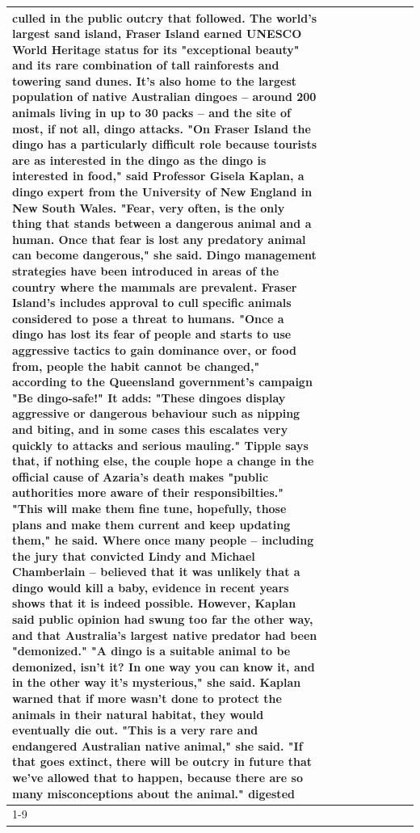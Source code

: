 \begin{table}[H]
\begin{tabular}{lllrlllll}
culled in the public outcry that followed. The world's largest sand island, Fraser Island earned UNESCO World Heritage status for its "exceptional beauty" and its rare combination of tall rainforests and towering sand dunes. It's also home to the largest population of native Australian dingoes -- around 200 animals living in up to 30 packs -- and the site of most, if not all, dingo attacks. "On Fraser Island the dingo has a particularly difficult role because tourists are as interested in the dingo as the dingo is interested in food," said Professor Gisela Kaplan, a dingo expert from the University of New England in New South Wales. "Fear, very often, is the only thing that stands between a dangerous animal and a human. Once that fear is lost any predatory animal can become dangerous," she said. Dingo management strategies have been introduced in areas of the country where the mammals are prevalent. Fraser Island's includes approval to cull specific animals considered to pose a threat to humans. "Once a dingo has lost its fear of people and starts to use aggressive tactics to gain dominance over, or food from, people the habit cannot be changed," according to the Queensland government's campaign "Be dingo-safe!" It adds: "These dingoes display aggressive or dangerous behaviour such as nipping and biting, and in some cases this escalates very quickly to attacks and serious mauling." Tipple says that, if nothing else, the couple hope a change in the official cause of Azaria's death makes "public authorities more aware of their responsibilties." "This will make them fine tune, hopefully, those plans and make them current and keep updating them," he said. Where once many people -- including the jury that convicted Lindy and Michael Chamberlain -- believed that it was unlikely that a dingo would kill a baby, evidence in recent years shows that it is indeed possible. However, Kaplan said public opinion had swung too far the other way, and that Australia's largest native predator had been "demonized." "A dingo is a suitable animal to be demonized, isn't it? In one way you can know it, and in the other way it's mysterious," she said. Kaplan warned that if more wasn't done to protect the animals in their natural habitat, they would eventually die out. "This is a very rare and endangered Australian native animal," she said. "If that goes extinct, there will be outcry in future that we've allowed that to happen, because there are so many misconceptions about the animal." digested \\
\cline{1-9}

\end{tabular}
\end{table}
